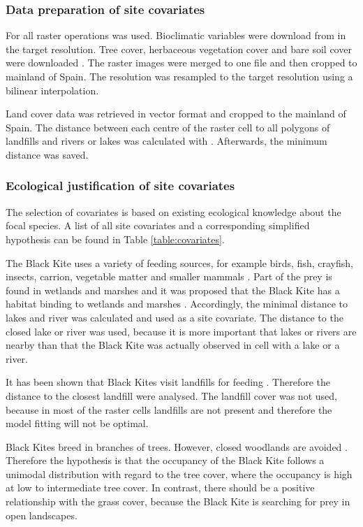 \begin{multicols}{2}
\subsubsection*{Data preparation of site covariates}
For all raster operations \textcite{raster} was used. Bioclimatic variables were download from \textcite{Fick2017} in the target resolution. Tree cover, herbaceous vegetation cover and bare soil cover were downloaded \parencite{Buchhorn2020, land_cover_data}. The raster images were merged to one file and then cropped to mainland of Spain. The resolution was resampled to the target resolution using a bilinear interpolation.

Land cover data was retrieved in vector format \parencite{clc2018} and cropped to the mainland of Spain. The distance between each centre of the raster cell to all polygons of landfills and rivers or lakes was calculated with \textcite{rgeos}. Afterwards, the minimum distance was saved.  


\subsubsection*{Ecological justification of site covariates}
The selection of covariates is based on existing ecological knowledge about the focal species. A list of all site covariates and a corresponding simplified hypothesis can be found in Table \ref{table:covariates}.

The Black Kite uses a variety of feeding sources, for example birds, fish, crayfish, insects, carrion, vegetable matter and smaller mammals \parencite{Sergio1999,Vinuela1992, BirdLife2021}. Part of the prey is found in wetlands and marshes and it was proposed that the Black Kite has a habitat binding to wetlands and marshes \parencite{Veiga1990, Tanferna2013}. Accordingly, the minimal distance to lakes and river was calculated and used as a site covariate. The distance to the closed lake or river was used, because it is more important that lakes or rivers are nearby than that the Black Kite was actually observed in cell with a lake or a river. 

It has been shown that Black Kites visit landfills for feeding \parencite{DeGiacomo2008, Blanco1994}. Therefore the distance to the closest landfill were analysed. The landfill cover was not used, because in most of the raster cells landfills are not present and therefore the model fitting will not be optimal.

Black Kites breed in branches of trees. However, closed woodlands are avoided \parencite{Tanferna2013}. Therefore the hypothesis is that the occupancy of the Black Kite follows a unimodal distribution with regard to the tree cover, where the occupancy is high at low to intermediate tree cover. In contrast, there should be a positive relationship with the grass cover, because the Black Kite is searching for prey in open landscapes.  



\end{multicols}
